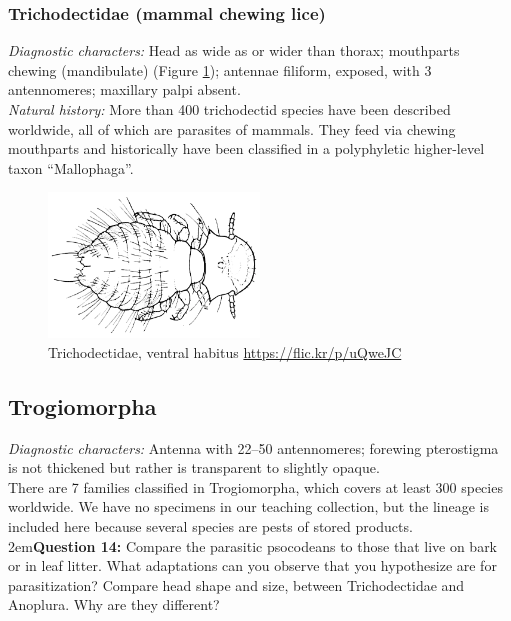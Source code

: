 \documentclass[letterpaper, 11pt]{article}
\begin{document}
\subsubsection{Trichodectidae (mammal chewing lice)}
\noindent{}\textit{Diagnostic characters:} Head as wide as or wider than thorax; mouthparts chewing (mandibulate) (Figure \ref{fig:trichodectid}); antennae filiform, exposed, with 3 antennomeres; maxillary palpi absent. \\

\noindent{}\textit{Natural history:} More than 400 trichodectid species have been described worldwide, all of which are parasites of mammals. They feed via chewing mouthparts and historically have been classified in a polyphyletic higher-level taxon ``Mallophaga''.\\

\begin{figure}[ht!]
 \centering
 \includegraphics[width=0.5\textwidth]{trichodectidae.png}
 \caption{Trichodectidae, ventral habitus \citep[][Fig. 9B]{snodgrass1944feeding} \url{https://flic.kr/p/uQweJC}}
 \label{fig:trichodectid}
\end{figure}

\subsection{Trogiomorpha}
\noindent{}\textit{Diagnostic characters:} Antenna with 22--50 antennomeres; forewing pterostigma is not thickened but rather is transparent to slightly opaque.\\

\noindent{}There are 7 families classified in Trogiomorpha, which covers at least 300 species worldwide. We have no specimens in our teaching collection, but the lineage is included here because several species are pests of stored products.\\

\hangindent2em\textbf{Question 14:} Compare the parasitic psocodeans to those that live on bark or in leaf litter. What adaptations can you observe that you hypothesize are for parasitization? Compare head shape and size, between Trichodectidae and Anoplura. Why are they different?\\
\end{document}
